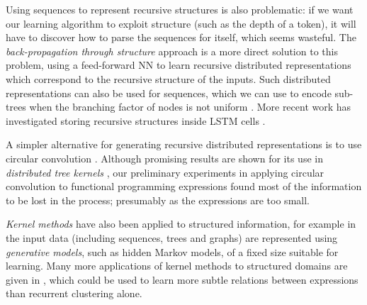 Using sequences to represent recursive structures is also problematic: if we
want our learning algorithm to exploit structure (such as the depth of a token),
it will have to discover how to parse the sequences for itself, which seems
wasteful. The \emph{back-propagation through structure} approach
\cite{goller1996learning} is a more direct solution to this problem, using a
feed-forward NN to learn recursive distributed representations
\cite{pollack1990recursive} which correspond to the recursive structure of the
inputs. Such distributed representations can also be used for sequences, which
we can use to encode sub-trees when the branching factor of nodes is not uniform
\cite{kwasny1995tail}. More recent work has investigated storing recursive
structures inside LSTM cells \cite{zhu2015long}.

A simpler alternative for generating recursive distributed representations is to
use circular convolution \cite{conf/ijcai/Plate91}. Although promising results
are shown for its use in \emph{distributed tree kernels}
\cite{zanzotto2012distributed}, our preliminary experiments in applying
circular convolution to functional programming expressions found most of the
information to be lost in the process; presumably as the expressions are too
small.

\emph{Kernel methods} have also been applied to structured information, for
example in \cite{Gartner2003} the input data (including sequences, trees and
graphs) are represented using \emph{generative models}, such as hidden Markov
models, of a fixed size suitable for learning. Many more applications of kernel
methods to structured domains are given in \cite{bakir2007predicting}, which
could be used to learn more subtle relations between expressions than recurrent
clustering alone.
